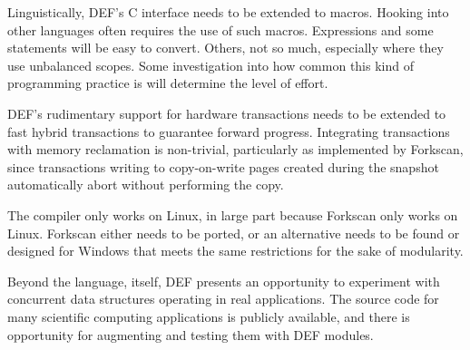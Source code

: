 Linguistically, DEF's C interface needs to be extended to macros.  Hooking into other languages often requires the use of such macros.  Expressions and some statements will be easy to convert.  Others, not so much, especially where they use unbalanced scopes.  Some investigation into how common this kind of programming practice is will determine the level of effort.

DEF's rudimentary support for hardware transactions needs to be extended to fast hybrid transactions to guarantee forward progress.  Integrating transactions with memory reclamation is non-trivial, particularly as implemented by Forkscan, since transactions writing to copy-on-write pages created during the snapshot automatically abort without performing the copy.

The compiler only works on Linux, in large part because Forkscan only works on Linux.  Forkscan either needs to be ported, or an alternative needs to be found or designed for Windows that meets the same restrictions for the sake of modularity.

Beyond the language, itself, DEF presents an opportunity to experiment with concurrent data structures operating in real applications.  The source code for many scientific computing applications is publicly available, and there is opportunity for augmenting and testing them with DEF modules.
